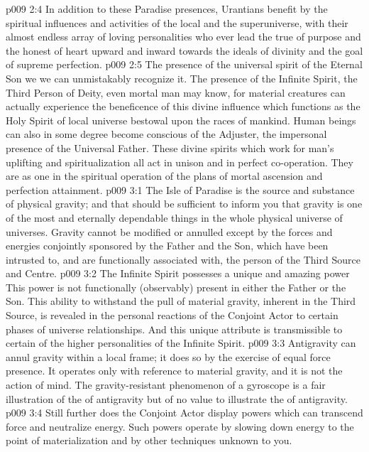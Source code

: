 \vs p009 2:4 In addition to these Paradise presences, Urantians benefit by the spiritual influences and activities of the local and the superuniverse, with their almost endless array of loving personalities who ever lead the true of purpose and the honest of heart upward and inward towards the ideals of divinity and the goal of supreme perfection.
\vs p009 2:5 The presence of the universal spirit of the Eternal Son we  we can unmistakably recognize it. The presence of the Infinite Spirit, the Third Person of Deity, even mortal man may know, for material creatures can actually experience the beneficence of this divine influence which functions as the Holy Spirit of local universe bestowal upon the races of mankind. Human beings can also in some degree become conscious of the Adjuster, the impersonal presence of the Universal Father. These divine spirits which work for man’s uplifting and spiritualization all act in unison and in perfect co\hyp{}operation. They are as one in the spiritual operation of the plans of mortal ascension and perfection attainment.
\vs p009 3:1 The Isle of Paradise is the source and substance of physical gravity; and that should be sufficient to inform you that gravity is one of the most  and eternally dependable things in the whole physical universe of universes. Gravity cannot be modified or annulled except by the forces and energies conjointly sponsored by the Father and the Son, which have been intrusted to, and are functionally associated with, the person of the Third Source and Centre.
\vs p009 3:2 \pc The Infinite Spirit possesses a unique and amazing power  This power is not functionally (observably) present in either the Father or the Son. This ability to withstand the pull of material gravity, inherent in the Third Source, is revealed in the personal reactions of the Conjoint Actor to certain phases of universe relationships. And this unique attribute is transmissible to certain of the higher personalities of the Infinite Spirit.
\vs p009 3:3 \pc Antigravity can annul gravity within a local frame; it does so by the exercise of equal force presence. It operates only with reference to material gravity, and it is not the action of mind. The gravity\hyp{}resistant phenomenon of a gyroscope is a fair illustration of the  of antigravity but of no value to illustrate the  of antigravity.
\vs p009 3:4 Still further does the Conjoint Actor display powers which can transcend force and neutralize energy. Such powers operate by slowing down energy to the point of materialization and by other techniques unknown to you.
